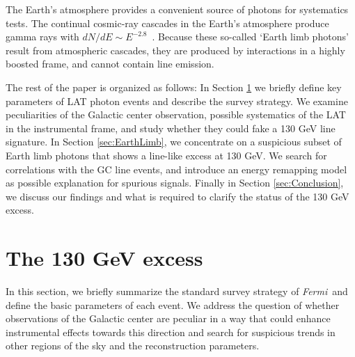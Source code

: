 \documentclass[aps,twocolumn,prd,superscriptaddress,showpacs,nofootinbib,fixfloat]{revtex4}
\newcommand{\Fermi}{{\slshape Fermi}}
\newcommand\Refsec[1]{Section \ref{sec:#1}}
\begin{document}
The Earth's atmosphere provides a convenient source of
photons for systematics tests.  The continual cosmic-ray
cascades in the Earth's atmosphere produce gamma rays with
$dN/dE \sim E^{-2.8}$~\citep{FermiLimb}.  Because these
so-called `Earth limb photons' result from atmospheric
cascades, they are produced by interactions in a highly
boosted frame, and cannot contain line emission.
\medskip

The rest of the paper is organized as follows: In \Refsec{130GeV} we briefly
define key parameters of LAT photon events and describe the survey strategy.
We examine peculiarities of the Galactic center observation, possible
systematics of the LAT in the instrumental frame, and study whether they could
fake a 130 GeV line signature. In \Refsec{EarthLimb}, we concentrate on a
suspicious subset of Earth limb photons that shows a line-like excess at 130
GeV. We search for correlations with the GC line events, and introduce an
energy remapping model as possible explanation for spurious signals.  Finally in
\Refsec{Conclusion}, we discuss our findings and what is required to clarify
the status of the 130 GeV excess.





\section{The 130 GeV excess}
\label{sec:130GeV}
In this section, we briefly summarize the standard survey strategy of \Fermi\ 
and define the basic parameters of each event.  We
address the question of whether observations of the Galactic center
are peculiar in a way that could enhance instrumental
effects towards this direction and search for suspicious trends in
other regions of the sky and the reconstruction parameters.

\end{document}
